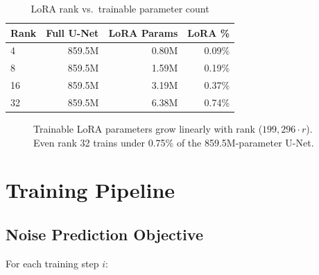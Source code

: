 \documentclass[11pt]{article}
\begin{document}
\begin{table}[!htbp]
\centering
\caption{LoRA rank vs.\ trainable parameter count}
\label{tab:params}
\begin{tabular}{lrrr}
\toprule
Rank & Full U-Net & LoRA Params & LoRA \% \\
\midrule
4 & 859.5M & 0.80M & 0.09\% \\
8 & 859.5M & 1.59M & 0.19\% \\
16 & 859.5M & 3.19M & 0.37\% \\
32 & 859.5M & 6.38M & 0.74\% \\
\bottomrule
\end{tabular}
\end{table}

\begin{figure}[!htbp]
\centering
{}
\caption{Trainable LoRA parameters grow linearly with rank ($199{,}296\cdot r$). Even rank 32 trains under 0.75\% of the 859.5M-parameter U-Net.}
\label{fig:params}
\end{figure}

\section{Training Pipeline}

\subsection{Noise Prediction Objective}

For each training step $i$:
\end{document}
